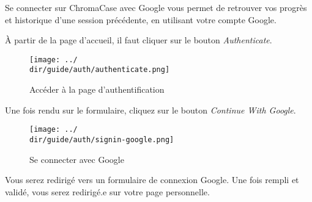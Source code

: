 Se connecter sur ChromaCase avec Google vous permet de retrouver vos progrès et historique d’une session précédente, en utilisant votre compte Google.

À partir de la page d’accueil, il faut cliquer sur le bouton \textit{Authenticate}.

\begin{figure}[H]
	\texttt{[image: ../\\dir/guide/auth/authenticate.png]}
	\caption{Accéder à la page d'authentification}
\end{figure}

Une fois rendu sur le formulaire, cliquez sur le bouton \textit{Continue With Google}.

\begin{figure}[H]
	\begin{center}
		\texttt{[image: ../\\dir/guide/auth/signin-google.png]}
		\caption{Se connecter avec Google}
	\end{center}
\end{figure}

Vous serez redirigé vers un formulaire de connexion Google. Une fois rempli et validé, vous serez redirigé.e sur votre page personnelle.
